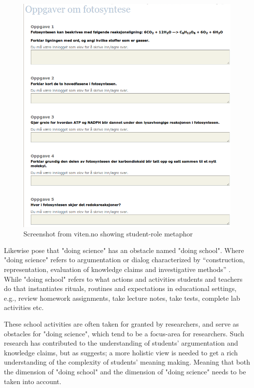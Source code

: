 \begin{figure}
\centering
\includegraphics[width=1\textwidth]{img/theoretical/vitenassessment.png}
\caption{Screenshot from viten.no showing student-role metaphor}
\label{fig:scrshotviten}
\end{figure}

Likewise \citet{jimenez2000doing} pose that "doing science" has an obstacle named "doing school". Where "doing science" refers to argumentation or dialog characterized by “construction, representation, evaluation of knowledge claims and investigative methods” \citep{jimenez2000doing}. While "doing school" refers to what actions and activities students and teachers do that instantiates rituals, routines and expectations in educational settings, e.g., review homework assignments, take lecture notes, take tests, complete lab activities etc. 

These school activities are often taken for granted by researchers, and serve as obstacles for "doing science", which tend to be a focus-area for researchers. Such research has contributed to the understanding of students' argumentation and knowledge claims, but as \citet*{furberg2008students} suggests; a more holistic view is needed to get a rich understanding of the complexity of students' meaning making. Meaning that both the dimension of "doing school" and the dimension of "doing science" needs to be taken into account. 

